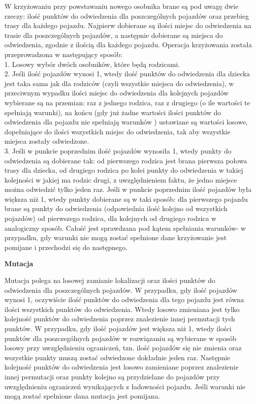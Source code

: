 \documentclass[a4paper, twoside, 12pt, justified]{article}
\begin{document}
	W krzyżowaniu przy powstawaniu nowego osobnika brane są pod uwagę dwie rzeczy: ilość punktów do odwiedzenia dla poszczególnych pojazdów oraz przebieg trasy dla każdego pojazdu. Najpierw dobierane są ilości miejsc do odwiedzenia na trasie dla poszczególnych pojazdów, a następnie dobierane są miejsca do odwiedzenia, zgodnie z ilością dla każdego pojazdu. Operacja krzyżowania została przeprowadzona w następujący sposób: \\
	1. Losowy wybór dwóch osobników, które będą rodzicami.\\
	2. Jeśli ilość pojazdów wynosi 1, wtedy ilość punktów do odwiedzenia dla dziecka jest taka sama jak dla rodziców (czyli wszystkie miejsca do odwiedzenia), w przeciwnym wypadku ilości miejsc do odwiedzenia dla kolejnych pojazdów wybierane są na przemian: raz z jednego rodzica, raz z drugiego (o ile wartości te spełniają warunki), na końcu (gdy już żadne wartości ilości punktów do odwiedzenia dla pojazdu nie spełniają warunków ) ustawiane są wartości losowe, dopełniające do ilości wszystkich miejsc do odwiedzenia, tak aby wszystkie miejsca zostały odwiedzone.\\
	3. Jeśli w punkcie poprzednim ilość pojazdów wynosiła 1, wtedy punkty do odwiedzenia są dobierane tak: od pierwszego rodzica jest brana pierwsza połowa trasy dla dziecka, od drugiego rodzica po kolei punkty do odwiedzenia w takiej kolejności w jakiej ma rodzic drugi, z uwzględnieniem faktu, że jedno miejsce można odwiedzić tylko jeden raz. Jeśli w punkcie poprzednim ilość pojazdów była większa niż 1, wtedy punkty dobierane są w taki sposób: dla pierwszego pojazdu brane są punkty do odwiedzenia (odpowiednia ilość kolejno od wszystkich pojazdów) od pierwszego rodzica, dla kolejnych od drugiego rodzica w analogiczny sposób. Całość jest sprawdzana pod kątem spełniania warunków- w przypadku, gdy warunki nie mogą zostać spełnione dane krzyżowanie jest pomijane i przechodzi się do następnego.\\
	
	\begin{center}
		\textbf{Mutacja}
	\end{center}

	Mutacja polega na losowej zamianie lokalizacji oraz ilości punktów do odwiedzenia dla poszczególnych pojazdów. W przypadku, gdy ilość pojazdów wynosi 1, oczywiście ilość punktów do odwiedzenia dla tego pojazdu jest równa ilości wszystkich punktów do odwiedzenia. Wtedy losowo zmieniana jest tylko kolejność punktów do odwiedzenia poprzez znalezienie innej permutacji tych punktów. W przypadku, gdy ilość pojazdów jest większa niż 1, wtedy ilości punktów dla poszczególnych pojazdów w rozwiązaniu są wybierane w sposób losowy przy uwzględnieniu ograniczeń, tzn. ilość pojazdów się nie zmienia oraz wszystkie punkty muszą zostać odwiedzone dokładnie jeden raz. Następnie kolejność punktów do odwiedzenia jest losowo zamieniane poprzez znalezienie innej permutacji oraz punkty kolejno są przydzielane do pojazdów przy uwzględnieniu ograniczeń wynikających z ładowności pojazdu. Jeśli warunki nie mogą zostać spełnione dana mutacja jest pomijana.
	
\end{document}
